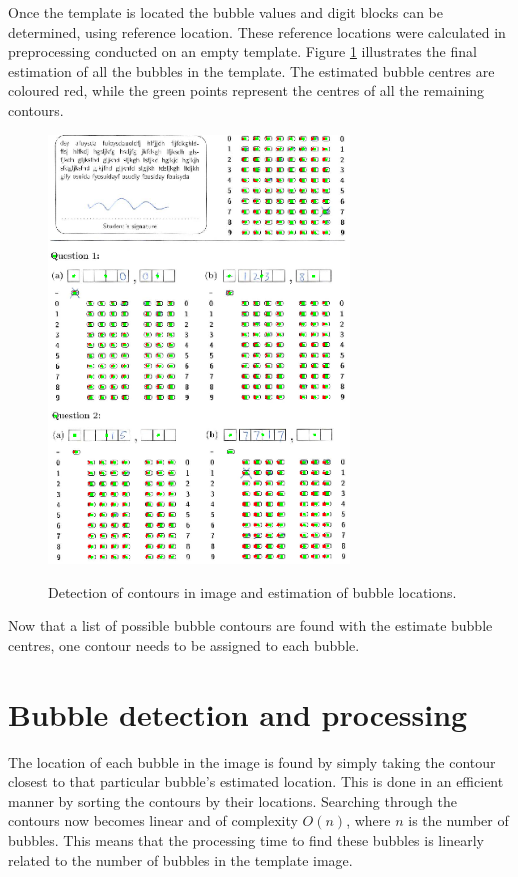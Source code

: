 Once the template is located the bubble values and digit blocks can be determined, using reference location. These reference locations were calculated in preprocessing conducted on an empty template. Figure \ref{fig:FinalEstimate} illustrates the final estimation of all the bubbles in the template. The estimated bubble centres are coloured red, while the green points represent the centres of all the remaining contours.

\begin{figure}
  \centering
  \includegraphics[width=8cm]{FinalEstimate}\\
  \caption{Detection of contours in image and estimation of bubble locations.}
  \label{fig:FinalEstimate}
\end{figure}

Now that a list of possible bubble contours are found with the estimate bubble centres, one contour needs to be assigned to each bubble.

\section{Bubble detection and processing}
The location of each bubble in the image is found by simply taking the contour closest to that particular bubble's estimated location. This is done in an efficient manner by sorting the contours by their locations. Searching through the contours now becomes linear and of complexity $O(n)$, where $n$ is the number of bubbles. This means that the processing time to find these bubbles is linearly related to the number of bubbles in the template image. 

